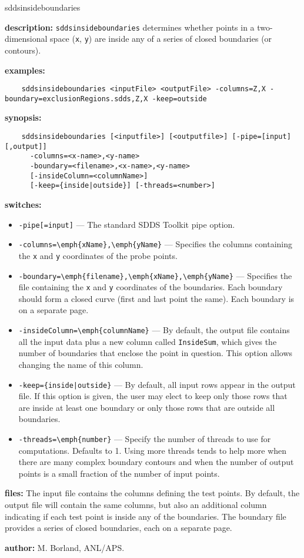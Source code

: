 \begin{sddsprog}{sddsinsideboundaries}
  \item \textbf{description:} \verb|sddsinsideboundaries| determines whether points in a two-dimensional space (\verb|x|, \verb|y|) are inside any of a series of closed boundaries (or contours).
  \item \textbf{examples:}
    \begin{verbatim}
    sddsinsideboundaries <inputFile> <outputFile> -columns=Z,X -boundary=exclusionRegions.sdds,Z,X -keep=outside
    \end{verbatim}
  \item \textbf{synopsis:}
    \begin{verbatim}
    sddsinsideboundaries [<inputfile>] [<outputfile>] [-pipe=[input][,output]]
      -columns=<x-name>,<y-name>
      -boundary=<filename>,<x-name>,<y-name>
      [-insideColumn=<columnName>]
      [-keep={inside|outside}] [-threads=<number>]
    \end{verbatim}
  \item \textbf{switches:}
    \begin{itemize}
      \item \verb|-pipe[=input]| --- The standard SDDS Toolkit pipe option.
      \item \verb|-columns=\emph{xName},\emph{yName}| --- Specifies the columns containing the \verb|x| and \verb|y| coordinates of the probe points.
      \item \verb|-boundary=\emph{filename},\emph{xName},\emph{yName}| --- Specifies the file containing the \verb|x| and \verb|y| coordinates of the boundaries. Each boundary should form a closed curve (first and last point the same). Each boundary is on a separate page.
      \item \verb|-insideColumn=\emph{columnName}| --- By default, the output file contains all the input data plus a new column called \verb|InsideSum|, which gives the number of boundaries that enclose the point in question. This option allows changing the name of this column.
      \item \verb!-keep={inside|outside}! --- By default, all input rows appear in the output file. If this option is given, the user may elect to keep only those rows that are inside at least one boundary or only those rows that are outside all boundaries.
      \item \verb|-threads=\emph{number}| --- Specify the number of threads to use for computations. Defaults to 1. Using more threads tends to help more when there are many complex boundary contours and when the number of output points is a small fraction of the number of input points.
    \end{itemize}
  \item \textbf{files:}
    The input file contains the columns defining the test points. By default, the output file will contain the same columns, but also an additional column indicating if each test point is inside any of the boundaries. The boundary file provides a series of closed boundaries, each on a separate page.
  \item \textbf{author:} M. Borland, ANL/APS.
\end{sddsprog}

